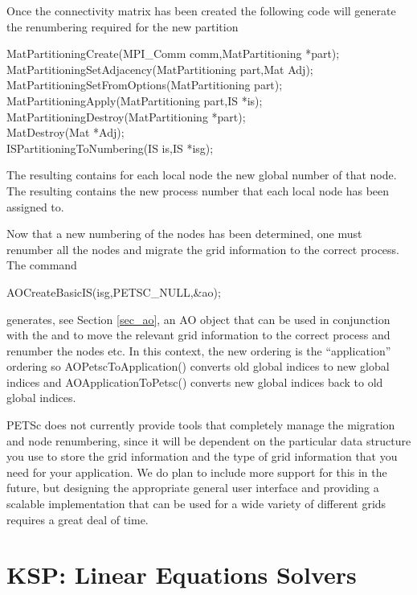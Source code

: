 Once the connectivity matrix has been created the following code will
generate the renumbering required for the new partition
\begin{tabbing}
 MatPartitioningCreate(MPI\_Comm comm,MatPartitioning *part);\\
 MatPartitioningSetAdjacency(MatPartitioning part,Mat Adj);\\
 MatPartitioningSetFromOptions(MatPartitioning part);\\
 MatPartitioningApply(MatPartitioning part,IS *is);\\
 MatPartitioningDestroy(MatPartitioning *part); \\
 MatDestroy(Mat *Adj);\\
 ISPartitioningToNumbering(IS is,IS *isg);
\end{tabbing}
The resulting  contains for each local node the new global
number of that node. The resulting  contains the new process number
that each local node has been assigned to.

Now that a new numbering of the nodes has been determined, one must
renumber all the nodes and migrate the grid information to the correct process.
The command
\begin{tabbing}
 AOCreateBasicIS(isg,PETSC\_NULL,\&ao);
\end{tabbing}
generates, see Section \ref{sec_ao}, an AO object that can be used in conjunction with the
 and  to move the relevant grid information to the correct process
and renumber the nodes etc.
In this context, the new ordering is the ``application'' ordering so AOPetscToApplication()
converts old global indices to new global indices and AOApplicationToPetsc() converts new
global indices back to old global indices.

PETSc does not currently provide tools that completely manage the migration and
node renumbering, since it will be dependent on the particular data structure you
use to store the grid information and the type of grid information that you need
for your application. We do plan to include more support for this in the future,
but designing the appropriate general user interface and providing a scalable
implementation that can be used for a wide variety of different grids requires a
great deal of time.




\cleardoublepage
\chapter{KSP: Linear Equations Solvers} 
\label{ch_ksp}


